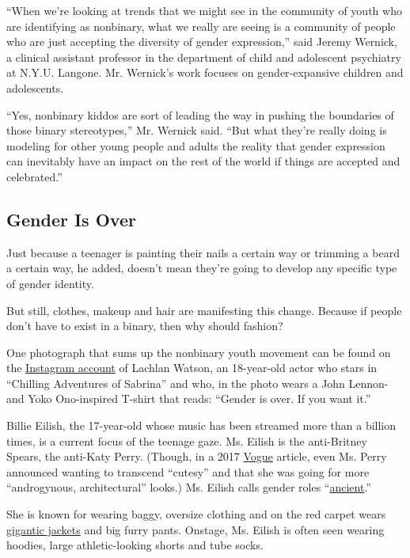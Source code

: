 ``When we're looking at trends that we might see in the community of
youth who are identifying as nonbinary, what we really are seeing is a
community of people who are just accepting the diversity of gender
expression,'' said Jeremy Wernick, a clinical assistant professor in the
department of child and adolescent psychiatry at N.Y.U. Langone. Mr.
Wernick's work focuses on gender-expansive children and adolescents.

``Yes, nonbinary kiddos are sort of leading the way in pushing the
boundaries of those binary stereotypes,'' Mr. Wernick said. ``But what
they're really doing is modeling for other young people and adults the
reality that gender expression can inevitably have an impact on the rest
of the world if things are accepted and celebrated.''

\hypertarget{gender-is-over}{%
\subsection{Gender Is Over}\label{gender-is-over}}

Just because a teenager is painting their nails a certain way or
trimming a beard a certain way, he added, doesn't mean they're going to
develop any specific type of gender identity.

But still, clothes, makeup and hair are manifesting this change. Because
if people don't have to exist in a binary, then why should fashion?

One photograph that sums up the nonbinary youth movement can be found on
the \href{https://www.instagram.com/p/Bqk3o6SHq7h/}{Instagram account}
of Lachlan Watson, an 18-year-old actor who stars in ``Chilling
Adventures of Sabrina'' and who, in the photo wears a John Lennon- and
Yoko Ono-inspired T-shirt that reads: ``Gender is over. If you want
it.''

Billie Eilish, the 17-year-old whose music has been streamed more than a
billion times, is a current focus of the teenage gaze. Ms. Eilish is the
anti-Britney Spears, the anti-Katy Perry. (Though, in a 2017
\href{https://www.vogue.com/article/katy-perry-interview-religion-childhood-may-vogue-cover}{Vogue}
article, even Ms. Perry announced wanting to transcend ``cutesy'' and
that she was going for more ``androgynous, architectural'' looks.) Ms.
Eilish calls gender roles
``\href{https://www.thefader.com/2019/03/05/billie-eilish-cover-story}{ancient}.''

She is known for wearing baggy, oversize clothing and on the red carpet
wears
\href{https://www.usatoday.com/story/life/entertainthis/2019/05/14/billie-eilish-says-she-wears-baggy-clothes-so-people-cant-body-shame/3664386002/}{gigantic
jackets} and big furry pants. Onstage, Ms. Eilish is often seen wearing
hoodies, large athletic-looking shorts and tube socks.

